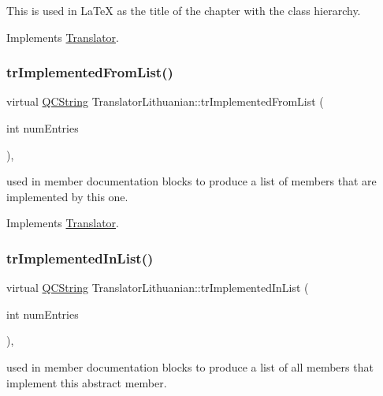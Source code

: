 This is used in La\+TeX as the title of the chapter with the class hierarchy. 

Implements \mbox{\hyperlink{class_translator}{Translator}}.

\mbox{\label{class_translator_lithuanian_af22d8f61bfadc2ea390091fada198ee4}} 
\subsubsection{\texorpdfstring{trImplementedFromList()}{trImplementedFromList()}}
{\footnotesize\ttfamily virtual \mbox{\hyperlink{class_q_c_string}{Q\+C\+String}} Translator\+Lithuanian\+::tr\+Implemented\+From\+List (\begin{DoxyParamCaption}\item[{int}]{num\+Entries }\end{DoxyParamCaption})\hspace{0.3cm}{\ttfamily [inline]}, {\ttfamily [virtual]}}

used in member documentation blocks to produce a list of members that are implemented by this one. 

Implements \mbox{\hyperlink{class_translator}{Translator}}.

\mbox{\label{class_translator_lithuanian_a86bd421b0c4350e8e1d241137938a721}} 
\subsubsection{\texorpdfstring{trImplementedInList()}{trImplementedInList()}}
{\footnotesize\ttfamily virtual \mbox{\hyperlink{class_q_c_string}{Q\+C\+String}} Translator\+Lithuanian\+::tr\+Implemented\+In\+List (\begin{DoxyParamCaption}\item[{int}]{num\+Entries }\end{DoxyParamCaption})\hspace{0.3cm}{\ttfamily [inline]}, {\ttfamily [virtual]}}

used in member documentation blocks to produce a list of all members that implement this abstract member. 

